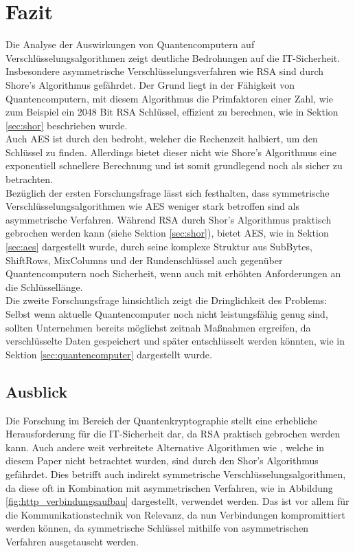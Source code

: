 \section{Fazit}
Die Analyse der Auswirkungen von Quantencomputern auf Verschlüsselungsalgorithmen
zeigt deutliche Bedrohungen auf die IT-Sicherheit. Insbesondere asymmetrische 
Verschlüsselungsverfahren wie RSA sind durch Shore's Algorithmus gefährdet. 
Der Grund liegt in der Fähigkeit von Quantencomputern, mit diesem Algorithmus
die Primfaktoren einer Zahl, wie zum Beispiel ein 2048 Bit RSA Schlüssel, 
effizient zu berechnen, wie in Sektion \ref{sec:shor} beschrieben wurde.\\
Auch AES ist durch den  bedroht, welcher die Rechenzeit 
halbiert, um den Schlüssel zu finden. Allerdings bietet dieser 
nicht wie Shore's Algorithmus eine exponentiell schnellere Berechnung und ist somit
grundlegend noch als sicher zu betrachten.\\
Bezüglich der ersten Forschungsfrage lässt sich festhalten, dass symmetrische 
Verschlüsselungsalgorithmen wie AES weniger stark betroffen sind als 
asymmetrische Verfahren. Während RSA durch Shor's Algorithmus praktisch 
gebrochen werden kann (siehe Sektion \ref{sec:shor}), bietet AES,
wie in Sektion \ref{sec:aes} dargestellt wurde, durch seine komplexe Struktur aus SubBytes, 
ShiftRows, MixColumns und der Rundenschlüssel auch gegenüber Quantencomputern 
noch Sicherheit, wenn auch mit erhöhten Anforderungen an die Schlüssellänge.\\
Die zweite Forschungsfrage hinsichtlich 
zeigt die Dringlichkeit des Problems: Selbst wenn 
aktuelle Quantencomputer noch nicht leistungsfähig 
genug sind, sollten Unternehmen bereits möglichst zeitnah 
Maßnahmen ergreifen, da verschlüsselte Daten gespeichert 
und später entschlüsselt werden könnten, wie in Sektion 
\ref{sec:quantencomputer} dargestellt wurde.\\

\subsection{Ausblick}
Die Forschung im Bereich der Quantenkryptographie stellt eine erhebliche 
Herausforderung für die IT-Sicherheit dar, da RSA praktisch gebrochen werden 
kann. Auch andere weit verbreitete Alternative Algorithmen wie ,
welche in diesem Paper nicht betrachtet wurden,
sind durch den Shor's Algorithmus gefährdet. Dies betrifft auch indirekt symmetrische
Verschlüsselungsalgorithmen, da diese oft in Kombination 
mit asymmetrischen Verfahren, wie in Abbildung \ref{fig:http_verbindungsaufbau} dargestellt, 
verwendet werden. Das ist vor allem für die Kommunikationstechnik von Relevanz, da nun
Verbindungen kompromittiert werden können, da symmetrische Schlüssel mithilfe
von asymmetrischen Verfahren ausgetauscht werden.\\


